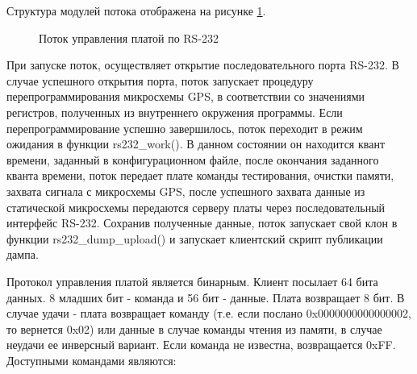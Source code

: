 Структура модулей потока отображена на рисунке \ref{pic:rs232_dumper}.

\begin{figure}[h]
\begin{center}
\end{center}
\caption{Поток управления платой по RS-232}
\label{pic:rs232_dumper}
\end{figure}

При запуске поток, осуществляет открытие последовательного порта RS-232. В случае успешного открытия порта, поток запускает
процедуру перепрограммирования микросхемы GPS, в соответствии со значениями регистров, полученных из
внутреннего окружения программы. Если перепрограммирование успешно завершилось, поток переходит в режим ожидания в функции
rs232\_work(). В данном состоянии он находится квант времени, заданный в конфигурационном файле, после окончания заданного
кванта времени, поток передает плате команды тестирования, очистки памяти, захвата сигнала с микросхемы GPS, после успешного
захвата данные из статической микросхемы передаются серверу платы через последовательный интерфейс RS-232. Сохранив полученные
данные, поток запускает свой клон в функции rs232\_dump\_upload() и запускает клиентский скрипт публикации дампа.

Протокол управления платой является бинарным. Клиент посылает 64 бита данных.
8 младших бит - команда и 56 бит - данные. Плата возвращает 8 бит. В случае
удачи - плата возвращает команду (т.е. если послано 0x0000000000000002, то вернется 0x02) или данные в случае команды чтения из
памяти, в случае неудачи ее инверсный вариант. Если команда не известна, возвращается 0xFF.
Доступными командами являются:

